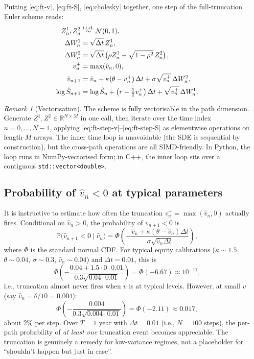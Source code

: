 \documentclass[11pt]{article}
\theoremstyle{plain}
\theoremstyle{definition}
\theoremstyle{remark}
\newtheorem{remark}[theorem]{Remark}
\begin{document}
Putting \eqref{eq:ft-v}, \eqref{eq:ft-S}, \eqref{eq:cholesky} together, one step of the full-truncation Euler scheme reads:
\begin{align}
    Z^1_n, Z^2_n &\stackrel{\mathrm{i.i.d.}}{\sim} \mathcal{N}(0, 1),                                \notag \\
    \Delta W^1_n &= \sqrt{\Delta t}\, Z^1_n,                                                       \notag \\
    \Delta W^2_n &= \sqrt{\Delta t}\, \bigl(\rho Z^1_n + \sqrt{1 - \rho^2}\, Z^2_n\bigr),         \notag \\
    v_n^+ &= \max(\hat v_n, 0),                                                                    \notag \\
    \hat v_{n+1} &= \hat v_n + \kappa(\theta - v_n^+)\,\Delta t + \sigma\sqrt{v_n^+}\,\Delta W^2_n,           \label{eq:ft-step-v}\\
    \log \hat S_{n+1} &= \log \hat S_n + \left(r - \tfrac12 v_n^+\right) \Delta t + \sqrt{v_n^+}\,\Delta W^1_n.                          \label{eq:ft-step-S}
\end{align}

\begin{remark}[Vectorisation]
The scheme is fully vectorisable in the path dimension. Generate $Z^1, Z^2 \in \mathbb{R}^{N \times M}$ in one call, then iterate over the time index $n = 0, \ldots, N-1$, applying \eqref{eq:ft-step-v}--\eqref{eq:ft-step-S} as elementwise operations on length-$M$ arrays. The inner time loop is unavoidable (the SDE is sequential by construction), but the cross-path operations are all SIMD-friendly. In Python, the loop runs in NumPy-vectorised form; in C++, the inner loop sits over a contiguous \texttt{std::vector<double>}.
\end{remark}

\subsection{Probability of $\hat v_n < 0$ at typical parameters}

It is instructive to estimate how often the truncation $v_n^+ = \max(\hat v_n, 0)$ actually fires. Conditional on $\hat v_n > 0$, the probability of $\hat v_{n+1} < 0$ is
\[
    \mathbb{P}\bigl(\hat v_{n+1} < 0 \mid \hat v_n\bigr) = \Phi\!\left(-\frac{\hat v_n + \kappa(\theta - \hat v_n)\Delta t}{\sigma\sqrt{\hat v_n \Delta t}}\right),
\]
where $\Phi$ is the standard normal CDF. For typical equity calibrations ($\kappa \sim 1.5$, $\theta \sim 0.04$, $\sigma \sim 0.3$, $\hat v_n \sim 0.04$) and $\Delta t = 0.01$, this is
\[
    \Phi\!\left(-\frac{0.04 + 1.5 \cdot 0 \cdot 0.01}{0.3\sqrt{0.04 \cdot 0.01}}\right) = \Phi(-6.67) \approx 10^{-11},
\]
i.e., truncation almost never fires when $v$ is at typical levels. However, at small $v$ (say $\hat v_n = \theta/10 = 0.004$):
\[
    \Phi\!\left(-\frac{0.004}{0.3\sqrt{0.004 \cdot 0.01}}\right) = \Phi(-2.11) \approx 0.017,
\]
about 2\% per step. Over $T = 1$ year with $\Delta t = 0.01$ (i.e., $N = 100$ steps), the per-path probability of \emph{at least one} truncation event becomes appreciable. The truncation is genuinely a remedy for low-variance regimes, not a placeholder for ``shouldn't happen but just in case''.
\end{document}
